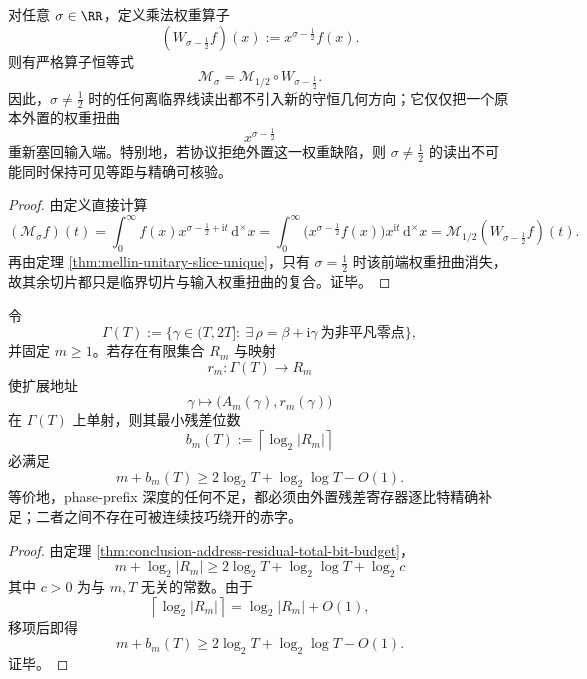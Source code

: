 \begin{corollary}[离临界线位移不产生新的守恒几何]\label{cor:conclusion-offcritical-shift-carries-no-new-geometry}
对任意 \(\sigma\in\RR\)，定义乘法权重算子
\[
(W_{\sigma-\frac12}f)(x):=x^{\sigma-\frac12}f(x).
\]
则有严格算子恒等式
\[
\mathcal M_\sigma=\mathcal M_{1/2}\circ W_{\sigma-\frac12}.
\]
因此，\(\sigma\neq \frac12\) 时的任何离临界线读出都不引入新的守恒几何方向；它仅仅把一个原本外置的权重扭曲
\[
x^{\sigma-\frac12}
\]
重新塞回输入端。特别地，若协议拒绝外置这一权重缺陷，则 \(\sigma\neq \frac12\) 的读出不可能同时保持可见等距与精确可核验。
\end{corollary}
\begin{proof}
由定义直接计算
\[
(\mathcal M_\sigma f)(t)
=
\int_0^\infty f(x)x^{\sigma-\frac12+\mathrm{i}t}\,\mathrm d^\times x
=
\int_0^\infty \bigl(x^{\sigma-\frac12}f(x)\bigr)x^{\mathrm{i}t}\,\mathrm d^\times x
=
\mathcal M_{1/2}(W_{\sigma-\frac12}f)(t).
\]
再由定理 \ref{thm:mellin-unitary-slice-unique}，只有 \(\sigma=\frac12\) 时该前端权重扭曲消失，故其余切片都只是临界切片与输入权重扭曲的复合。证毕。
\end{proof}

\begin{theorem}[前缀地址与外置残差之间的精确守恒律]\label{thm:conclusion-prefix-address-external-residual-exact-conservation}
令
\[
\Gamma(T):=\{\gamma\in(T,2T]:\ \exists\,\rho=\beta+\mathrm{i}\gamma\ \text{为非平凡零点}\},
\]
并固定 \(m\ge 1\)。若存在有限集合 \(R_m\) 与映射
\[
r_m:\Gamma(T)\to R_m
\]
使扩展地址
\[
\gamma\longmapsto \bigl(A_m(\gamma),r_m(\gamma)\bigr)
\]
在 \(\Gamma(T)\) 上单射，则其最小残差位数
\[
b_m(T):=\left\lceil \log_2 |R_m|\right\rceil
\]
必满足
\[
m+b_m(T)\ge 2\log_2 T+\log_2\log T-O(1).
\]
等价地，phase-prefix 深度的任何不足，都必须由外置残差寄存器逐比特精确补足；二者之间不存在可被连续技巧绕开的赤字。
\end{theorem}
\begin{proof}
由定理 \ref{thm:conclusion-address-residual-total-bit-budget}，
\[
m+\log_2|R_m|
\ge
2\log_2 T+\log_2\log T+\log_2 c
\]
其中 \(c>0\) 为与 \(m,T\) 无关的常数。由于
\[
\left\lceil \log_2|R_m|\right\rceil=\log_2|R_m|+O(1),
\]
移项后即得
\[
m+b_m(T)\ge 2\log_2 T+\log_2\log T-O(1).
\]
证毕。
\end{proof}

